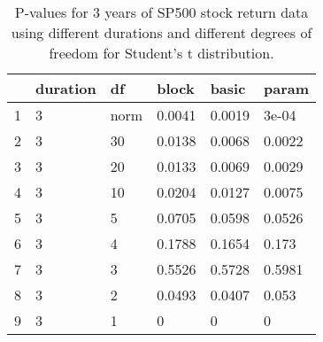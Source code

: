 \begin{table}[ht]
\centering
\caption{P-values for 3 years of SP500 stock return 
                   data using different durations
  and different degrees of freedom for Student's t distribution.} 
\label{table:SP5003}
\begin{tabular}{rlllll}
  \hline
 & duration & df & block & basic & param \\ 
  \hline
1 & 3 & norm & 0.0041 & 0.0019 & 3e-04 \\ 
  2 & 3 & 30 & 0.0138 & 0.0068 & 0.0022 \\ 
  3 & 3 & 20 & 0.0133 & 0.0069 & 0.0029 \\ 
  4 & 3 & 10 & 0.0204 & 0.0127 & 0.0075 \\ 
  5 & 3 & 5 & 0.0705 & 0.0598 & 0.0526 \\ 
  6 & 3 & 4 & 0.1788 & 0.1654 & 0.173 \\ 
  7 & 3 & 3 & 0.5526 & 0.5728 & 0.5981 \\ 
  8 & 3 & 2 & 0.0493 & 0.0407 & 0.053 \\ 
  9 & 3 & 1 & 0 & 0 & 0 \\ 
   \hline
\end{tabular}
\end{table}

